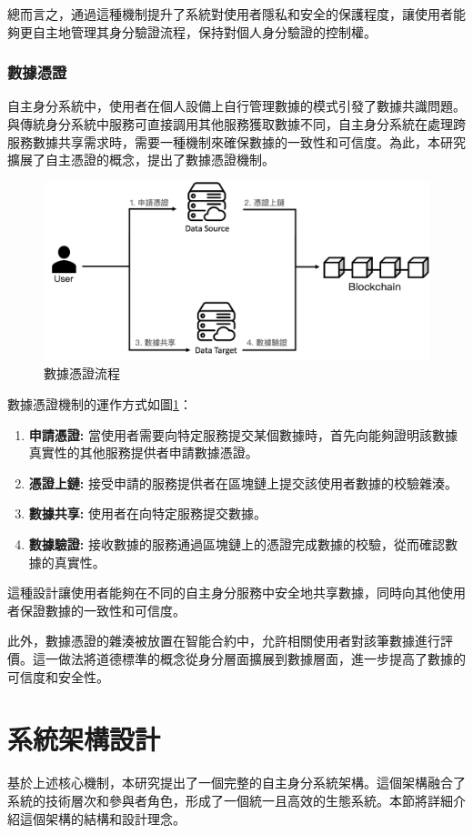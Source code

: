 總而言之，通過這種機制提升了系統對使用者隱私和安全的保護程度，讓使用者能夠更自主地管理其身分驗證流程，保持對個人身分驗證的控制權。
\subsubsection{數據憑證}
自主身分系統中，使用者在個人設備上自行管理數據的模式引發了數據共識問題。與傳統身分系統中服務可直接調用其他服務獲取數據不同，自主身分系統在處理跨服務數據共享需求時，需要一種機制來確保數據的一致性和可信度。為此，本研究擴展了自主憑證的概念，提出了數據憑證機制。
\begin{figure}
  \centering
  \includegraphics[width=\linewidth,keepaspectratio]{figures/flow-dc.png}
  \caption{數據憑證流程}
  \label{fig:flow-dc}
\end{figure}
數據憑證機制的運作方式如圖\ref{fig:flow-dc}：
\begin{enumerate}
  \item \textbf{申請憑證:} 當使用者需要向特定服務提交某個數據時，首先向能夠證明該數據真實性的其他服務提供者申請數據憑證。
  \item \textbf{憑證上鏈:} 接受申請的服務提供者在區塊鏈上提交該使用者數據的校驗雜湊。
  \item \textbf{數據共享:} 使用者在向特定服務提交數據。
  \item \textbf{數據驗證:} 接收數據的服務通過區塊鏈上的憑證完成數據的校驗，從而確認數據的真實性。
\end{enumerate}
這種設計讓使用者能夠在不同的自主身分服務中安全地共享數據，同時向其他使用者保證數據的一致性和可信度。

此外，數據憑證的雜湊被放置在智能合約中，允許相關使用者對該筆數據進行評價。這一做法將道德標準的概念從身分層面擴展到數據層面，進一步提高了數據的可信度和安全性。
\section{系統架構設計}
基於上述核心機制，本研究提出了一個完整的自主身分系統架構。這個架構融合了系統的技術層次和參與者角色，形成了一個統一且高效的生態系統。本節將詳細介紹這個架構的結構和設計理念。

